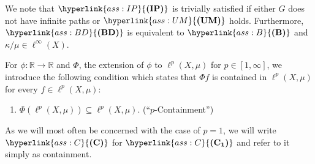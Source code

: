 \documentclass[letterpaper]{article}
\theoremstyle{definition}
\theoremstyle{named}
\numberwithin{equation}{section}
\newcommand{\IP}{\hyperlink{ass:IP}{\textup{\textbf{(IP)}}}}
\newcommand{\UM}{\hyperlink{ass:UM}{\textup{\textbf{(UM)}}}}
\newcommand{\B}{\hyperlink{ass:B}{\textup{\textbf{(B)}}}}
\newcommand{\BD}{\hyperlink{ass:BD}{\textup{\textbf{(BD)}}}}
\newcommand{\C}{\hyperlink{ass:C}{\textup{\textbf{(C)}}}}
\newcommand{\Cp}{\hyperlink{ass:C}{\textup{\textbf{(C\textsubscript{p})}}}}
\newcommand{\Cone}{\hyperlink{ass:C}{\textup{\textbf{(C\textsubscript{1})}}}}
\newcommand{\R}{\mathbb{R}}
\begin{document}
We note that $\IP$ is trivially satisfied if either $G$
does not have infinite paths or $\UM$ holds.
Furthermore, 
$\BD$ is equivalent to
$\B$ and $\kappa/\mu \in \ell^\infty(X)$.

For $\phi \colon \R \to \R$ and $\Phi$, the extension of $\phi$ to $\ell^p(X,\mu)$ for $p \in [1,\infty]$, 
we introduce the following condition which
states that $\Phi f$ is contained in $\ell^p(X,\mu)$ for every $f \in \ell^p(X,\mu)$:
\begin{enumerate}
	\item[$\Cp$]\hypertarget{ass:C}{} $\Phi(\ell^p(X,\mu))\subseteq \ell^p(X,\mu)$. \hfill(``$p$-Containment'')
\end{enumerate}
As we will most often be concerned with the case of $p=1$, we will write $\C$ for 
$\Cone$ and refer to it simply as containment.
\end{document}

